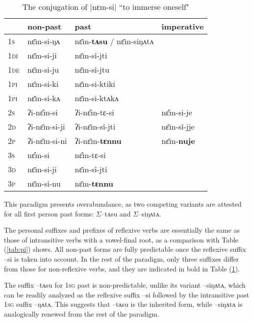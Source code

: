 \documentclass[twoside,a4paper,11pt]{article}
\newcommand{\ipa}[1]{{\phon#1}}
\newcommand{\grise}[1]{\cellcolor{lightgray}\textbf{#1}}
\newcommand{\ro}{$\Sigma$}
\begin{document}
\begin{table}[h]
\caption{The conjugation of |\ipa{nɛm-si}|  ``to immerse oneself"  } \centering \label{tab:nyamsi}
\begin{tabular}{l|l|l|l}  
\toprule
& non-past & past & imperative\\
\midrule
\textsc{1s}  &  \ipa{nɛ̄m-si-ŋʌ}   &  \ipa{nɛ̄m-\textbf{tʌsu}} / \ipa{nɛ̄m-siŋʌtʌ}  \grise{}\\ 
\textsc{1di}  &  \ipa{nɛ̄m-si-ji}   &  \ipa{nɛ̄m-sî-jti} \\
\textsc{1de}  &  \ipa{nɛ̄m-si-ju}   &  \ipa{nɛ̄m-sî-jtu} \\ 
\textsc{1pi}  &  \ipa{nɛ̄m-si-ki}   &  \ipa{nɛ̄m-si-ktiki} \\ 
\textsc{1pi}  &  \ipa{nɛ̄m-si-kʌ}   &  \ipa{nɛ̄m-si-ktʌkʌ} \\ 
\midrule
\textsc{2s}  &  \ipa{ʔi-nɛ̂m-si}   &  \ipa{ʔi-nɛ̂m-tɛ-si}   &  \ipa{nɛ̂m-si-je} \\ 
\textsc{2d}  &  \ipa{ʔi-nɛ̄m-si-ji}   &  \ipa{ʔi-nɛ̄m-sî-jti}   &  \ipa{nɛ̄m-sî-jje} \\
\textsc{2p}  &  \ipa{ʔi-nɛ̄m-si-ni}   &  \ipa{ʔi-nɛ̄m-\textbf{tɛnnu}} \grise{}  &  \ipa{nɛ̄m-\textbf{nuje}} \grise{}\\ 
\midrule
\textsc{3s}  &  \ipa{nɛ̂m-si}   &  \ipa{nɛ̂m-tɛ-si} \\ 
\textsc{3d}  &  \ipa{nɛ̄m-si-ji}   &  \ipa{nɛ̄m-sî-jti} \\ 
\textsc{3p}  &  \ipa{nɛ̄m-si-nu}   &  \ipa{nɛ̄m-\textbf{tɛnnu}} \grise{}\\ 
\bottomrule
\end{tabular}
\end{table}
This paradigm presents overabundance, as two competing variants are attested for all first person past forms: \ro{}\ipa{--tʌsu} and \ro{}\ipa{--siŋʌtʌ}.



 The personal suffixes and prefixes of reflexive verbs are essentially the same as those of  intransitive verbs with a vowel-final root, as a comparison with Table (\ref{tab:pi}) shows. All non-past forms are fully predictable once the reflexive suffix \ipa{--si} is taken into account. In the rest of the paradigm,  only three suffixes   differ  from those for non-reflexive verbs, and they are indicated in bold in Table (\ref{tab:nyamsi}).
 
   The   suffix \ipa{--tʌsu} for \textsc{1sg} past  is   non-predictable, unlike its variant \ipa{--siŋʌtʌ}, which can be readily analyzed as the reflexive suffix \ipa{--si} followed by the intransitive past \textsc{1sg} suffix \ipa{--ŋʌtʌ}. This   suggests that  \ipa{--tʌsu} is the inherited form, while  \ipa{--siŋʌtʌ} is analogically renewed from the rest of the paradigm.
 
\end{document}
